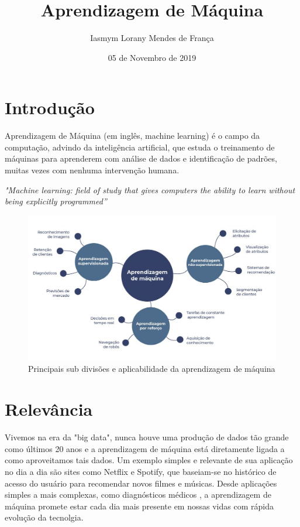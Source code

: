 \documentclass{article}
\title{Aprendizagem de Máquina}
\author{Iasmym Lorany Mendes de França}
\date{05 de Novembro de 2019}
\begin{document}
\maketitle

\section{Introdução}
\hspace{0.5in}Aprendizagem de Máquina (em  inglês, machine learning) é o campo da computação, advindo da inteligência artificial, que estuda o treinamento de máquinas para aprenderem com análise de dados e identificação de padrões, muitas vezes com nenhuma intervenção humana.

\hspace{0.5in}\textit{"Machine learning: field of study that gives computers the ability to learn without being explicitly programmed”}\cite{arthursamuel}

\begin{figure}[h!]
\centering
\includegraphics[scale=0.5]{aprendizagem.jpg}
\caption{Principais sub divisões e aplicabilidade da aprendizagem de máquina\hspace{0.02in}\cite{isitics}}
\label{fig:aprendizagem}
\end{figure}

\section{Relevância}
\hspace{0.5in}Vivemos na era da "big data", nunca houve uma produção de dados tão grande como últimos 20 anos e a aprendizagem de máquina está diretamente ligada a como aproveitamos tais dados. Um exemplo simples e relevante de sua aplicação no dia a dia são sites como Netflix e Spotify, que baseiam-se no histórico de acesso do usuário para recomendar novos filmes e músicas. Desde aplicações simples a mais complexas, como diagnósticos médicos \cite{medico}, a aprendizagem de máquina promete estar cada dia mais presente em nossas vidas com rápida evolução da tecnolgia.
\end{document}
